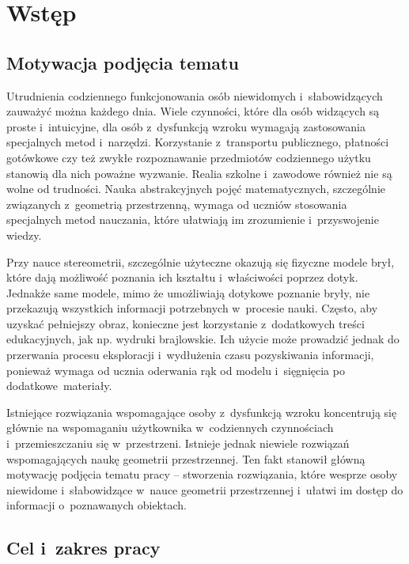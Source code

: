 \chapter{Wstęp}
\label{c:wstep}

\section{Motywacja podjęcia tematu}

Utrudnienia codziennego funkcjonowania osób niewidomych i~słabowidzących zauważyć można każdego dnia. Wiele czynności, które dla osób widzących są proste i~intuicyjne, dla osób z~dysfunkcją wzroku wymagają zastosowania specjalnych metod i~narzędzi. Korzystanie z~transportu publicznego, płatności gotówkowe czy też zwykłe rozpoznawanie przedmiotów codziennego użytku stanowią dla nich poważne wyzwanie. Realia szkolne i~zawodowe również nie są wolne od trudności. Nauka abstrakcyjnych pojęć matematycznych, szczególnie związanych z~geometrią przestrzenną, wymaga od uczniów stosowania specjalnych metod nauczania, które ułatwiają im zrozumienie i~przyswojenie wiedzy.

Przy nauce stereometrii, szczególnie użyteczne okazują się fizyczne modele brył, które dają możliwość poznania ich kształtu i~właściwości poprzez dotyk. Jednakże same modele, mimo że umożliwiają dotykowe poznanie bryły, nie przekazują wszystkich informacji potrzebnych w~procesie nauki. Często, aby uzyskać pełniejszy obraz, konieczne jest korzystanie z~dodatkowych treści edukacyjnych, jak np. wydruki brajlowskie. Ich użycie może prowadzić jednak do przerwania procesu eksploracji i~wydłużenia czasu pozyskiwania informacji, ponieważ wymaga od ucznia oderwania rąk od modelu i~sięgnięcia po dodatkowe~materiały.

Istniejące rozwiązania wspomagające osoby z~dysfunkcją wzroku koncentrują się głównie na wspomaganiu użytkownika w~codziennych czynnościach i~przemieszczaniu się w~przestrzeni. Istnieje jednak niewiele rozwiązań wspomagających naukę geometrii przestrzennej. Ten fakt stanowił główną motywację podjęcia tematu pracy -- stworzenia rozwiązania, które wesprze osoby niewidome i~słabowidzące w~nauce geometrii przestrzennej i~ułatwi im dostęp do informacji o~poznawanych obiektach.

\section{Cel i~zakres pracy}

